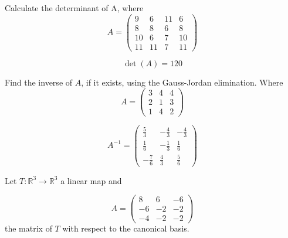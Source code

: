 \begin{questions}

\question Calculate the determinant of A, where
$$
A=\left(\begin{array}{rrrr}
9 & 6 & 11 & 6 \\
8 & 8 & 6 & 8 \\
10 & 6 & 7 & 10 \\
11 & 11 & 7 & 11
\end{array}\right)
$$

\begin{solution}
$$\det(A)=120$$
\end{solution}

\question Find the inverse of $A$, if it exists, using the Gauss-Jordan elimination. Where
$$
A=\left(\begin{array}{rrr}
3 & 4 & 4 \\
2 & 1 & 3 \\
1 & 4 & 2
\end{array}\right)
$$

\begin{solution}
$$A^{-1}=\left(\begin{array}{rrr}
\frac{5}{3} & -\frac{4}{3} & -\frac{4}{3} \\
\frac{1}{6} & -\frac{1}{3} & \frac{1}{6} \\
-\frac{7}{6} & \frac{4}{3} & \frac{5}{6}
\end{array}\right)$$
\end{solution}

\question Let $T:\mathbb{R}^3\rightarrow\mathbb{R}^3$  a linear map and
 
$$
A=\left(\begin{array}{rrr}
8 & 6 & -6 \\
-6 & -2 & -2 \\
-4 & -2 & -2
\end{array}\right)
$$
the matrix of $T$ with respect to the canonical basis.
\end{questions}
